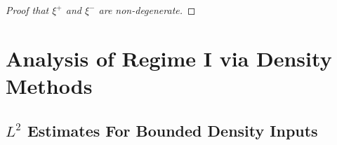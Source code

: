 \begin{proof}[Proof that $\xi^+$ and $\xi^-$ are non-degenerate]
\begin{comment}
    \[ R(J(t),T(t))T(t) = A(t) J(t), \]
    We have $A(t)_{jk} = R_{jk11}(t)$, and because we are working in normal coordinates, for $k \neq 1$, $|R_{jk11}(t)| \lesssim t$. Since $v_1 = 0$, we have $\| A(t) \| \lesssim t$. Now $J(0) = v$, and $J'(0) = 0$, and so applying e.g. a Neumann series to write out the solution of the equation $J''(t) = A(t) J(t)$, we have $|J(t_0) - J(0)| \lesssim t_0^2$. But $J(t_0) = Df(0)[v]$, and so we obtain that
    \[ |Df(0)[v] - v| \lesssim t_0^2. \]
    Thus if $a'(0) = x'(0) + t_0^2 u$, then $|u| \lesssim 1$. But now we conclude that
    \[ 0 = a'(0) + b'(0) + c'(0) = x'(0) + t_0^2 u + t_0 w. \]
    Thus $x'(0) = - t_0 w - t_0^2 u$. Since we know $x'_1(0)$, we have $u_1 = 0$. But now returning to \eqref{seconderivxequation}, we can conclude that
    \[ |x'(0) \cdot w + t_0| = |t_0^2 w \cdot u| \lesssim t_0^2, \]
    we thus find that
    \[ |x_1''(0) - 2 t_0| = |- 2 x'(0) \cdot (0,w) + 2 t_0| \lesssim t_0^2. \]
    If $\varepsilon$ is chosen appropriately with respect to the implicit constant in this equation, which is uniform given the precompactness of $U$, then the bound $t_0 \leq \varepsilon$ implies that $x_1''(0) \geq t_0$, and $|x'(0)| \geq t_0 / 2$. But if we now consider the \emph{angle} $\theta(s)$ between the geodesic from $x_0$ to $x_1$ and the geodesic from $x_0$ to $x(s)$, then
    \[ \cos(\theta(s)) = \frac{e_1 \cdot x(s)}{|e_1| |x(s)|} = \frac{x_1(s)}{|x(s)|}. \]
    Then
    \[ \cos(\theta(s)) = \frac{x_1''(0) s^2 / 2 + O(s^3)}{|x'(0)| s + O(s^2)} \geq s + O(s^2). \]
    Thus $\theta(s) \leq \pi/2 - s + O(s^2)$. Since $\theta(0) = \pi/2$, we conclude that $\theta'(0) \geq 1$.
    \end{comment}
\end{proof}

\section{Analysis of Regime I via Density Methods} \label{regime1firstsection}

\subsection{\boldmath $L^2$ Estimates For Bounded Density Inputs}


